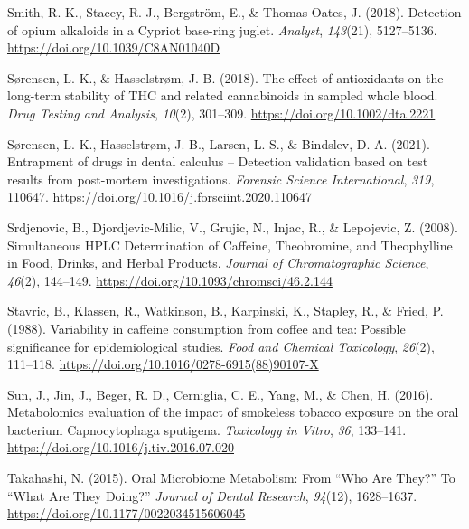 \documentclass[
]{article}
\newlength{\cslhangindent}
\newenvironment{CSLReferences}[2] %
 {\begin{list}{}{%
  \setlength{\itemindent}{0pt}
  \setlength{\leftmargin}{0pt}
  \setlength{\parsep}{0pt}
  \ifodd #1
   \setlength{\leftmargin}{\cslhangindent}
   \setlength{\itemindent}{-1\cslhangindent}
  \fi
  \setlength{\itemsep}{#2\baselineskip}}}
 {\end{list}}
\begin{document}
\begin{CSLReferences}{1}{0}
Smith, R. K., Stacey, R. J., Bergström, E., \& Thomas-Oates, J. (2018).
Detection of opium alkaloids in a {Cypriot} base-ring juglet.
\emph{Analyst}, \emph{143}(21), 5127--5136.
\url{https://doi.org/10.1039/C8AN01040D}

Sørensen, L. K., \& Hasselstrøm, J. B. (2018). The effect of
antioxidants on the long-term stability of {THC} and related
cannabinoids in sampled whole blood. \emph{Drug Testing and Analysis},
\emph{10}(2), 301--309. \url{https://doi.org/10.1002/dta.2221}

Sørensen, L. K., Hasselstrøm, J. B., Larsen, L. S., \& Bindslev, D. A.
(2021). Entrapment of drugs in dental calculus -- {Detection} validation
based on test results from post-mortem investigations. \emph{Forensic
Science International}, \emph{319}, 110647.
\url{https://doi.org/10.1016/j.forsciint.2020.110647}

Srdjenovic, B., Djordjevic-Milic, V., Grujic, N., Injac, R., \&
Lepojevic, Z. (2008). Simultaneous {HPLC Determination} of {Caffeine},
{Theobromine}, and {Theophylline} in {Food}, {Drinks}, and {Herbal
Products}. \emph{Journal of Chromatographic Science}, \emph{46}(2),
144--149. \url{https://doi.org/10.1093/chromsci/46.2.144}

Stavric, B., Klassen, R., Watkinson, B., Karpinski, K., Stapley, R., \&
Fried, P. (1988). Variability in caffeine consumption from coffee and
tea: {Possible} significance for epidemiological studies. \emph{Food and
Chemical Toxicology}, \emph{26}(2), 111--118.
\url{https://doi.org/10.1016/0278-6915(88)90107-X}

Sun, J., Jin, J., Beger, R. D., Cerniglia, C. E., Yang, M., \& Chen, H.
(2016). Metabolomics evaluation of the impact of smokeless tobacco
exposure on the oral bacterium {Capnocytophaga} sputigena.
\emph{Toxicology in Vitro}, \emph{36}, 133--141.
\url{https://doi.org/10.1016/j.tiv.2016.07.020}

Takahashi, N. (2015). Oral {Microbiome Metabolism}: {From} {``{Who Are
They}?''} To {``{What Are They Doing}?''} \emph{Journal of Dental
Research}, \emph{94}(12), 1628--1637.
\url{https://doi.org/10.1177/0022034515606045}


\end{CSLReferences}
\end{document}
